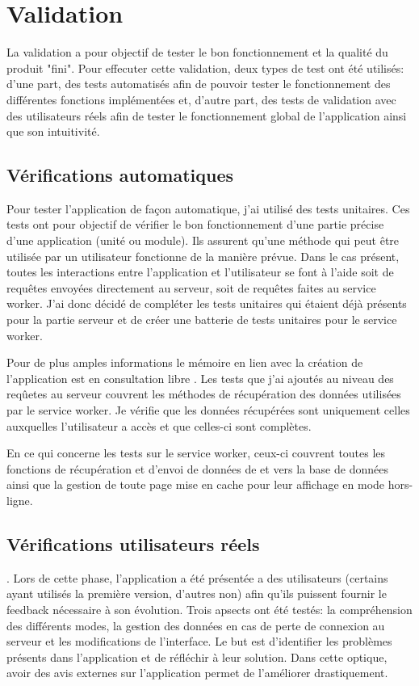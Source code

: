 \documentclass{EPL-master-thesis-covers-FR}
\begin{document}
			
			
			
			
	\chapter{Validation}
		La validation a pour objectif de tester le bon fonctionnement et la qualité du produit "fini". Pour effecuter cette validation, deux types de test ont été utilisés: d'une part, des tests automatisés afin de pouvoir tester le fonctionnement des différentes fonctions implémentées et, d'autre part, des tests  de validation avec des utilisateurs réels afin de tester le fonctionnement global de l'application ainsi que son intuitivité.

		

		\section{Vérifications automatiques}
			Pour tester l'application de façon automatique, j'ai utilisé des tests unitaires. Ces tests ont pour objectif de vérifier le bon fonctionnement d'une partie précise d'une application (unité ou module). Ils assurent qu'une méthode qui peut être utilisée par un utilisateur fonctionne de la manière prévue. Dans le cas présent, toutes les interactions entre l'application et l'utilisateur se font à l'aide soit de requêtes envoyées directement au serveur, soit de requêtes faites au service worker. J'ai donc décidé de compléter les tests unitaires qui étaient déjà présents pour la partie serveur et de créer une batterie de tests unitaires pour le service worker.

			Pour de plus amples informations le mémoire en lien avec la création de l'application est en consultation libre \cite{ref:haitiwater}. Les tests que j'ai ajoutés au niveau des reqûetes au serveur couvrent les méthodes de récupération des données utilisées par le service worker. Je vérifie que les données récupérées sont uniquement celles auxquelles l'utilisateur a accès et que celles-ci sont complètes.
			
			En ce qui concerne les tests sur le service worker, ceux-ci couvrent toutes les fonctions de récupération et d'envoi de données de et vers la base de données ainsi que la gestion de toute page mise en cache pour leur affichage en mode hors-ligne.

		\section{Vérifications utilisateurs réels}
.			Lors de cette phase, l'application a été présentée a des utilisateurs (certains ayant utilisés la première version, d'autres non) afin qu'ils puissent fournir le feedback nécessaire à son évolution. Trois apsects ont été testés: la compréhension des différents modes, la gestion des données en cas de perte de connexion au serveur et les modifications de l'interface. Le but est d'identifier les problèmes présents dans l'application et de réfléchir à leur solution. Dans cette optique, avoir des avis externes sur l'application permet de l'améliorer drastiquement.
			
\end{document}
